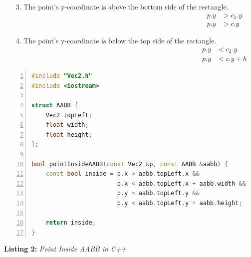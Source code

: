 \documentclass{article}
\begin{document}
\begin{multicols}{2}
    \begin{enumerate}
        \item[3.]The point's y-coordinate is above the bottom side of the rectangle.
        \begin{equation*}
            \begin{aligned}
                p.y & > c_1.y \\
                p.y & > c.y
            \end{aligned}
        \end{equation*}

        \item[4.] The point's y-coordinate is below the top side of the rectangle.
            \begin{equation*}
                \begin{aligned}
                    p.y & < c_2.y   \\
                    p.y & < c.y + h
                \end{aligned}
            \end{equation*}
    \end{enumerate}
\end{multicols}
\newpage
\begin{mdframed}[linecolor=black!30!white,linewidth=.5pt,extratopheight=1em]
    \begin{lstlisting}[language=C++, aboveskip=3mm,
        belowskip=3mm,
        showstringspaces=false,
        columns=flexible,
        basicstyle={\small\ttfamily},
        numbers=left,
        numberstyle=\tiny\color{gray},
        keywordstyle=\color{blue},
        commentstyle=\color{dkgreen},
        stringstyle=\color{mauve},
        breaklines=true,
        breakatwhitespace=true,
        tabsize=3,
        xleftmargin=1em]
#include "Vec2.h"
#include <iostream>

struct AABB {
    Vec2 topLeft;
    float width;
    float height;
};

bool pointInsideAABB(const Vec2 &p, const AABB &aabb) {
    const bool inside = p.x > aabb.topLeft.x &&
                        p.x < aabb.topLeft.x + aabb.width &&
                        p.y > aabb.topLeft.y &&
                        p.y < aabb.topLeft.y + aabb.height;

    return inside;
}
\end{lstlisting}

\end{mdframed}
\begin{center}
    \textbf{Listing 2:} \textit{Point Inside AABB in C++}
\end{center}
\end{document}
